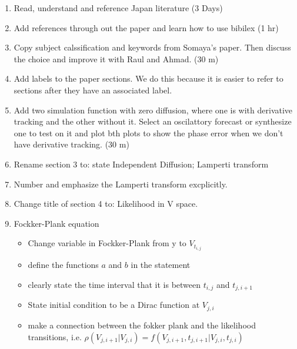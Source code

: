 \documentclass[12pt]{article}
\begin{document}
\begin{enumerate}
\item Read, understand and reference Japan literature (3 Days)
\item Add references through out the paper and learn how to use bibilex (1 hr)
\item Copy subject calssification and keywords from Somaya's paper. Then discuss the choice and improve it with Raul and Ahmad. (30 m)
\item Add labels to the paper sections. We do this because it is easier to refer to sections after they have an associated label.
\item Add two simulation function with zero diffusion, where one is with derivative tracking and the other without it. Select an oscilattory forecast or synthesize one to test on it and plot bth plots to show the phase error when we don't have derivative tracking. (30 m)
\item Rename section 3 to: state Independent Diffusion; Lamperti transform
\item Number and emphasize the Lamperti transform excplicitly.
\item Change title of section 4 to: Likelihood in V space.
\item Fockker-Plank equation
\begin{itemize}
\item Change variable in Fockker-Plank from y to $V_{t_{i,j}}$
\item define the functions $a$ and $b$ in the statement
\item  clearly state the time interval that it is between $t_{i,j}$ and $t_{j,i+1}$
\item State initial condition to be a Dirac function at $V_{j,i}$
\item make a connection between the fokker plank and the likelihood transitions, i.e. $\rho(V_{j,i+1}| V_{j,i})  = f(V_{j,i+1}, t_{j,i+1}|V_{j,i}, t_{j,i} )$
\end{itemize}


\end{enumerate}
\end{document}
